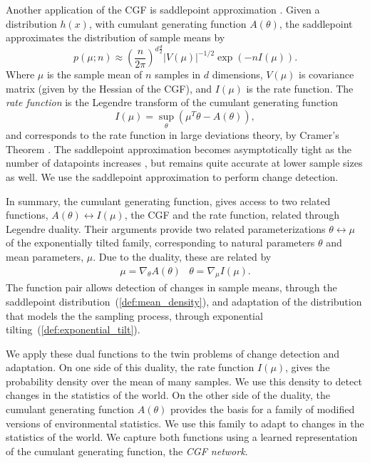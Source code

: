 \documentclass{article}      %
\begin{document}
Another application of the CGF is saddlepoint approximation \cite{daniels_saddlepoint_1954,barndorff-nielsen_edgeworth_1979}.
Given a distribution $h(x)$, with cumulant generating function $A(\theta)$, the saddlepoint approximates the distribution of sample means by
\begin{equation}
  p(\mu; n) \approx \left( \frac{n}{2\pi} \right)^{d\frac{d}{2}} |V(\mu)|^{-1/2} \exp(-n I(\mu)). \label{def:mean_density}
\end{equation}
Where $\mu$ is the sample mean of $n$ samples in $d$ dimensions, $V(\mu)$ is covariance matrix (given by the Hessian of the CGF), and $I(\mu)$ is the rate function.
The \textit{rate function} is the Legendre transform of the cumulant generating function
\begin{equation}
  I(\mu) = \sup_{\theta}(\mu^T \theta  - A(\theta) ), \label{eq:legendre_transform}
\end{equation}
and corresponds to the rate function in large deviations theory, by Cramer's Theorem \cite{dembo2009large}.
The saddlepoint approximation becomes asymptotically tight as the number of datapoints increases \cite{iltis_sharp_1995,chaganty_multidimensional_1986}, but remains quite accurate at lower sample sizes \cite{davison_saddlepoint_1988,ronchetti_empirical_1994} as well.
We use the saddlepoint approximation to perform change detection.

In summary, the cumulant generating function, gives access to two related functions, $A(\theta) \leftrightarrow I(\mu)$, the CGF and the rate function, related through Legendre duality.
Their arguments provide two related parameterizations $\theta \leftrightarrow \mu$ of the exponentially tilted family, corresponding to natural parameters $\theta$ and mean parameters, $\mu$.
Due to the duality, these are related by 
\begin{eqnarray}
  \mu = \nabla_\theta A(\theta) & \theta = \nabla_\mu I(\mu). \label{eq:duality_relations}
\end{eqnarray}
The function pair allows detection of changes in sample means, through the saddlepoint distribution~(\ref{def:mean_density}), and adaptation of the distribution that models the the sampling process, through exponential tilting~(\ref{def:exponential_tilt}).

We apply these dual functions to the twin problems of change detection and adaptation.
On one side of this duality, the rate function $I(\mu)$, gives the probability density over the mean of many samples.
We use this density to detect changes in the statistics of the world.
On the other side of the duality, the cumulant generating function $A(\theta)$ provides the basis for a family of modified versions of environmental statistics.
We use this family to adapt to changes in the statistics of the world.
We capture both functions using a learned representation of the cumulant generating function, the \textit{CGF network}.
\end{document}
